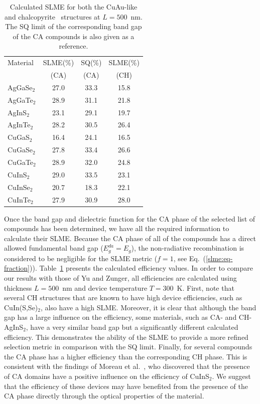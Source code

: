 \begin{refsection}
\begin{table}
\centering
\captionsetup{width=0.9\textwidth}
\renewcommand{\arraystretch}{1.2} 
\caption{Calculated SLME for both the \mbox{CuAu-like} and 
chalcopyrite~\cite{Yu2012} structures at $L=500$~\si{\nano\meter}. The SQ limit of the corresponding band 
gap of the CA compounds is also given as a reference.} 
\label{slme:tab-SLME} 
\begin{tabular}{l@{\hskip 1em}c@{\hskip 0.8em}c@{\hskip0.8em}c} 
\hline 
Material & SLME(\%) & SQ(\%) & SLME(\%)\\ 
		 &  (CA)	&  (CA) &  (CH)	 \\\hline 
AgGaSe$_2$ & 27.0 & 33.3 & 15.8 \\ 
AgGaTe$_2$ & 28.9 & 31.1 & 21.8 \\ 
AgInS$_2$  & 23.1 & 29.1 & 19.7 \\ 
AgInTe$_2$ & 28.2 & 30.5 & 26.4 \\ 
CuGaS$_2$  & 16.4 & 24.1 & 16.5 \\ 
CuGaSe$_2$ & 27.8 & 33.4 & 26.6 \\ 
CuGaTe$_2$ & 28.9 & 32.0 & 24.8 \\ 
CuInS$_2$  & 29.0 & 33.5 & 23.1 \\ 
CuInSe$_2$ & 20.7 & 18.3 & 22.1 \\ 
CuInTe$_2$ & 27.9 & 30.9 & 28.0 \\ \hline 
\end{tabular} 
\end{table}

Once the band gap and dielectric function for the CA phase of 
the selected list of compounds has been determined, we have all the required information to 
calculate their SLME. Because the CA phase of all of the compounds has a direct 
allowed fundamental band gap ($E_g^{da}=E_g$), the non-radiative recombination 
is considered to be negligible for the SLME metric ($f = 1$, see 
Eq.~(\ref{slme:eq-fraction})). Table~\ref{slme:tab-SLME} presents the 
calculated efficiency values.
In order to compare our results with those of Yu 
and Zunger, all efficiencies are calculated using thickness $L = 
500$~\si{\nano\meter} and device temperature \mbox{$T = 300$~\si{\kelvin}}. 
First, note that several CH structures that are known to have high device 
efficiencies, such as CuIn(S,Se)$_{2}$, also have a high SLME. Moreover, it is 
clear that although the band gap has a large influence on the efficiency, some 
materials, such as CA- and \mbox{CH-AgInS$_2$}, have a very similar band gap 
but a significantly different calculated efficiency. This demonstrates the 
ability of the SLME to provide a more refined selection metric in comparison 
with the SQ limit. Finally, for several compounds the CA phase 
has a higher efficiency than the corresponding CH phase. This is consistent 
with the findings of Moreau et al.~\cite{Moreau2015}, who discovered that the 
presence of CA domains have a positive influence on the efficiency of 
CuInS$_2$. We suggest that the efficiency of these devices may have benefited 
from the presence of the CA phase directly through the optical properties of 
the material. 


\end{refsection}
